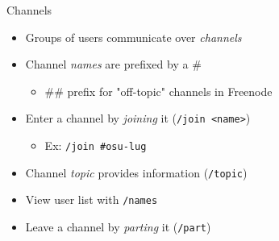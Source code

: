 \documentclass{beamer}
\begin{document}
\begin{frame}{Channels}
\begin{itemize}
	\item Groups of users communicate over \emph{channels}
	\item Channel \emph{names} are prefixed by a \#
	\begin{itemize}
		\item \#\# prefix for "off-topic" channels in Freenode
	\end{itemize}
	\item Enter a channel by \emph{joining} it (\texttt{/join <name>})
	\begin{itemize}
		\item Ex: \texttt{/join \#osu-lug}
	\end{itemize}
	\item Channel \emph{topic} provides information (\texttt{/topic})
	\item View user list with \texttt{/names}
	\item Leave a channel by \emph{parting} it (\texttt{/part})
\end{itemize}
\end{frame}
\end{document}
